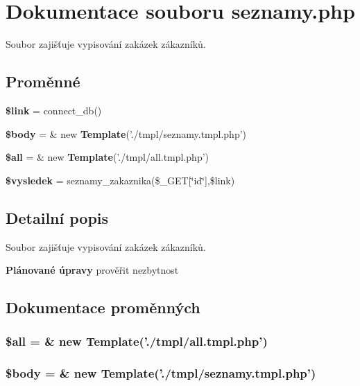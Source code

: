 \section{Dokumentace souboru seznamy.php}
\label{seznamy_8php}
Soubor zajišťuje vypisování zakázek zákazníků. 

\subsection*{Proměnné}
\begin{CompactItemize}
\item 
{\bf \$link} = connect\_\-db()
\item 
{\bf \$body} = \& new {\bf Template}('./tmpl/seznamy.tmpl.php')
\item 
{\bf \$all} = \& new {\bf Template}('./tmpl/all.tmpl.php')
\item 
{\bf \$vysledek} = seznamy\_\-zakaznika(\$\_\-GET[\char`\"{}id\char`\"{}],\$link)
\end{CompactItemize}


\subsection{Detailní popis}
Soubor zajišťuje vypisování zakázek zákazníků. 

\begin{Desc}
\item[{\bf Plánované úpravy}]prověřit nezbytnost \end{Desc}


\subsection{Dokumentace proměnných}
\subsubsection{\setlength{\rightskip}{0pt plus 5cm}\$all = \& new {\bf Template}('./tmpl/all.tmpl.php')}\label{seznamy_8php_3c74ea9d2348c9aba28d36e692bef2d2}


\subsubsection{\setlength{\rightskip}{0pt plus 5cm}\$body = \& new {\bf Template}('./tmpl/seznamy.tmpl.php')}\label{seznamy_8php_26b9f9373f7bb79dfcf8a86dff086b45}


